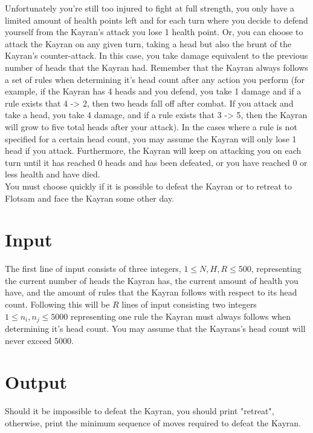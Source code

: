 \noindent Unfortunately you're still too injured to fight at full strength, you only have a limited amount of health points left 
and for each turn where you decide to defend yourself from the Kayran's attack you lose 1 health point. Or, you can choose to
attack the Kayran on any given turn, taking a head but also the brunt of the Kayran's counter-attack. In this case, you take damage 
equivalent to the previous number of heads that the Kayran had. Remember that the Kayran always follows a set of rules when determining it's head
count after any action you perform (for example, if the Kayran has 4 heads and you defend, you take 1 damage and if a rule exists that 4 -> 2, 
then two heads fall off after combat. If you attack and take a head, you take 4 damage, and if a rule exists that 3 -> 5, then the 
Kayran will grow to five total heads after your attack). In the cases where a rule is not specified for a certain head count, you may assume the 
Kayran will only lose 1 head if you attack. Furthermore, the Kayran will keep on attacking you on each turn until it has reached 0 heads and 
has been defeated, or you have reached 0 or less health and have died. \\

\noindent You must choose quickly if it is possible to defeat the Kayran or to retreat to Flotsam and face the Kayran
some other day.\\

\section*{Input}

The first line of input consists of three integers, $1 \leq N, H, R \leq 500$, representing the current number of heads the
Kayran has, the current amount of health you have, and the amount of rules that the Kayran follows with respect to its
head count. Following this will be $R$ lines of input consisting two integers $1 \leq n_i , n_j \leq 5000$ representing one
rule the Kayran must always follows when determining it's head count. You may assume that the Kayrans's head count will never
exceed 5000. \\

\section*{Output}
Should it be impossible to defeat the Kayran, you should print "retreat", otherwise, print the minimum sequence of 
moves required to defeat the Kayran. \\
